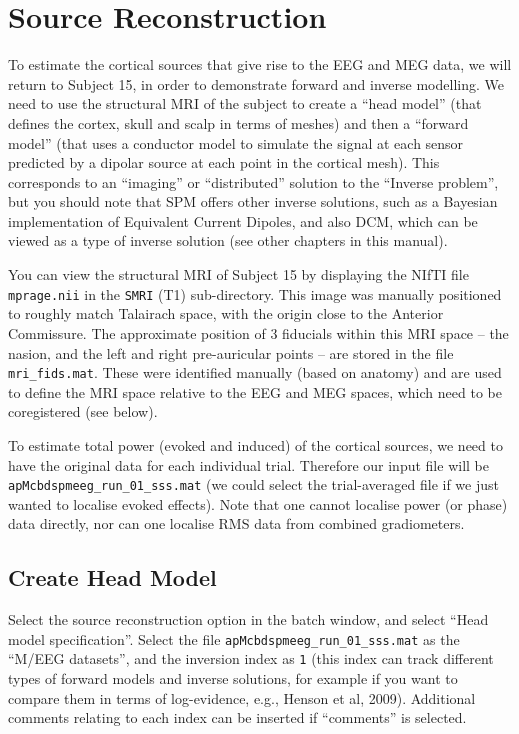 \section{Source Reconstruction}

To estimate the cortical sources that give rise to the EEG and MEG data, we will return to Subject 15, in order to demonstrate forward and inverse modelling. We need to use the structural MRI of the subject to create a ``head model'' (that defines the cortex, skull and scalp in terms of meshes) and then a ``forward model'' (that uses a conductor model to simulate the signal at each sensor predicted by a dipolar source at each point in the cortical mesh). This corresponds to an ``imaging'' or ``distributed'' solution to the ``Inverse problem'', but you should note that SPM offers other inverse solutions, such as a Bayesian implementation of Equivalent Current Dipoles, and also DCM, which can be viewed as a type of inverse solution (see other chapters in this manual).

You can view the structural MRI of Subject 15 by displaying the NIfTI file \texttt{mprage.nii} in the \texttt{SMRI} (T1) sub-directory. This image was manually positioned to roughly match Talairach space, with the origin close to the Anterior Commissure. The approximate position of 3 fiducials within this MRI space -- the nasion, and the left and right pre-auricular points -- are stored in the file \texttt{mri\_fids.mat}. These were identified manually (based on anatomy) and are used to define the MRI space relative to the EEG and MEG spaces, which need to be coregistered (see below).

To estimate total power (evoked and induced) of the cortical sources, we need to have the original data for each individual trial. Therefore our input file will be \texttt{apMcbdspmeeg\_run\_01\_sss.mat} (we could select the trial-averaged file if we just wanted to localise evoked effects). Note that one cannot localise power (or phase) data directly, nor can one localise RMS data from combined gradiometers.

\subsection{Create Head Model}

Select the source reconstruction option in the batch window, and select ``Head model specification''. Select the file \texttt{apMcbdspmeeg\_run\_01\_sss.mat} as the ``M/EEG datasets'', and the inversion index as \texttt{1} (this index can track different types of forward models and inverse solutions, for example if you want to compare them in terms of log-evidence, e.g., Henson et al, 2009). Additional comments relating to each index can be inserted if ``comments'' is selected. 

